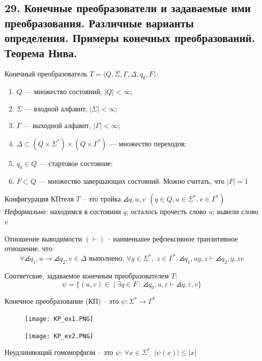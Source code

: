 \subsection{29. Конечные преобразователи и задаваемые ими преобразования. Различные варианты определения. Примеры конечных преобразований. Теорема Нива.}

\Def Конечный преобразователь $T = \langle Q, \Sigma, \Gamma, \Delta, q_0, F \rangle$:

\begin{enumerate}
    \item $Q$ — множество состояний, $|Q| < \infty$;
    \item $\Sigma$ — входной алфавит, $|\Sigma| < \infty$;
    \item $\Gamma$ — выходной алфавит, $|\Gamma| < \infty$;
    \item $\Delta \subset (Q \times \Sigma^*) \times ( Q \times \Gamma^*)$ — множество переходов;
    \item $q_0 \in Q$ — стартовое состояние;
    \item $F \subset Q$ — множество завершающих состояний. Можно считать, что $|F| = 1$
\end{enumerate}

\Def Конфигурация КПтеля $T$ -- это тройка $\angles{q, u, v}\ \ (q \in Q, u \in \Sigma^*, v \in \Gamma^*) $
\newline \textit{Неформально:} находимся в состоянии $q$; осталось прочесть слово $u$; вывели слово $v$

\Def Отношение выводимости $(\vdash)$ -- наименьшее рефлексивное транзитивное отношение, что:
$$
\forall \angles{q_1, u} \rightarrow \angles{q_2, v} \in \Delta \text{ выполнено: } \forall y \in \Sigma^*,\; z\in\Gamma^* : \angles{q_1,uy,z} \vdash \angles{q_2,y,zv}
$$

\Def Соответсвие, задаваемое конечным преобразователем $T$:
$$
\psi = \{(u,v) \in  \; | \; \exists q\in F \, : \, \angles{q_0, u, \varepsilon} \vdash \angles{q, \varepsilon, v}\}
$$

\Def Конечное преобразование (КП) -- это $\psi : \Sigma^* \rightarrow \Gamma^*$

\begin{figure}[h!]
    \centering
    \texttt{[image: KP\_ex1.PNG]}
\end{figure}
\newpage
\begin{figure}[h!]
    \centering
    \texttt{[image: KP\_ex2.PNG]}
\end{figure}

\Def Неудлиняющий гомоморфизм -- это $\psi :\, \forall x\in\Sigma^* \;\; |\psi(x)| \leqslant |x| $

